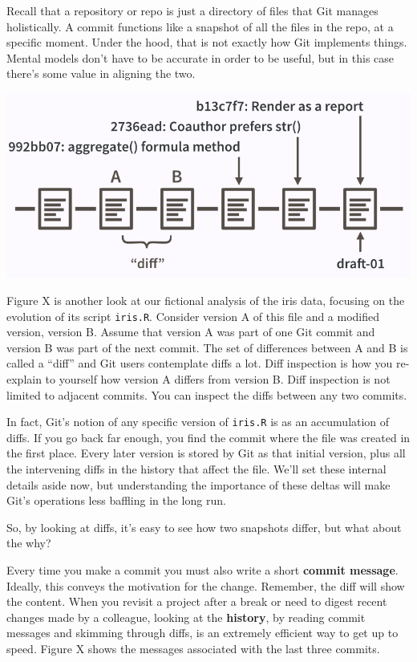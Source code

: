\documentclass[12pt]{article}
\begin{document}
Recall that a repository or repo is just a directory of files that Git
manages holistically. A commit functions like a snapshot of all the
files in the repo, at a specific moment. Under the hood, that is not
exactly how Git implements things. Mental models don't have to be
accurate in order to be useful, but in this case there's some value in
aligning the two.

\includegraphics[width=1\linewidth]{commit-diff-sha-tag}

Figure X is another look at our fictional analysis of the iris data,
focusing on the evolution of its script \texttt{iris.R}. Consider
version A of this file and a modified version, version B. Assume that
version A was part of one Git commit and version B was part of the next
commit. The set of differences between A and B is called a ``diff'' and
Git users contemplate diffs a lot. Diff inspection is how you re-explain
to yourself how version A differs from version B. Diff inspection is not
limited to adjacent commits. You can inspect the diffs between any two
commits.

In fact, Git's notion of any specific version of \texttt{iris.R} is as
an accumulation of diffs. If you go back far enough, you find the commit
where the file was created in the first place. Every later version is
stored by Git as that initial version, plus all the intervening diffs in
the history that affect the file. We'll set these internal details aside
now, but understanding the importance of these deltas will make Git's
operations less baffling in the long run.

So, by looking at diffs, it's easy to see how two snapshots differ, but
what about the why?

Every time you make a commit you must also write a short \textbf{commit
message}. Ideally, this conveys the motivation for the change. Remember,
the diff will show the content. When you revisit a project after a break
or need to digest recent changes made by a colleague, looking at the
\textbf{history}, by reading commit messages and skimming through diffs,
is an extremely efficient way to get up to speed. Figure X shows the
messages associated with the last three commits.
\end{document}
